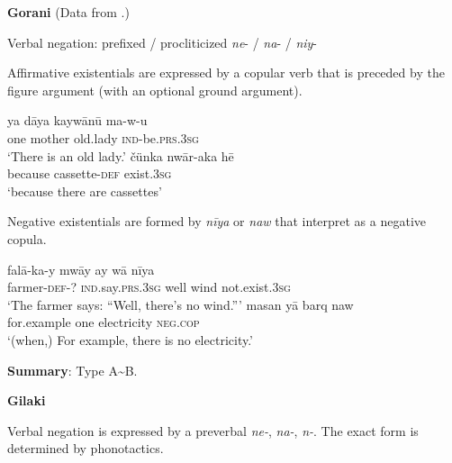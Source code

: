﻿\documentclass[output=paper]{langsci/langscibook}
\begin{document}
\begin{unindented}
\textbf{Gorani} (Data from \citealt{MahmoudveysiBailey2012}.)

Verbal negation: prefixed / procliticized \textit{ne}- / \textit{na}- /
\textit{niy}- \parencite[25]{MahmoudveysiBailey2012}

Affirmative existentials are expressed by a copular verb that is preceded by the figure argument (with an optional ground argument).
%
\begin{exe}\ex \gll ya   dāya    kaywānū ma-w-u \\
one mother old.lady  \textsc{ind}-be.\textsc{prs.3sg} \\
    \glt `There is an old lady.' \parencite[15]{MahmoudveysiBailey2012}
\ex \gll čünka    nwār-aka       hē \\
because cassette-\textsc{def}  exist.\textsc{3sg} \\
    \glt `because there are cassettes' \parencite[34]{MahmoudveysiBailey2012}
    \end{exe}

Negative existentials are formed by \textit{nīya} or \textit{naw} that
\citeauthor{MahmoudveysiBailey2012} interpret as a negative copula. 
%
\begin{exe}\ex
    \gll falā-ka-y mwāy ay     wā     nīya \\
farmer-\textsc{def}-?   \textsc{ind}.say.\textsc{prs}.\textsc{3sg}  well  wind  not.exist.\textsc{3sg} \\
    \glt `The farmer says: “Well, there's no wind.”'
\parencite[61]{MahmoudveysiBailey2012}
\ex \gll masan yā   barq         naw \\
for.example one electricity \textsc{neg.cop} \\
    \glt `(when,) For example, there is no electricity.'
\parencite[159]{MahmoudveysiBailey2012}
    \end{exe}

\textbf{Summary}: Type A{\textasciitilde}B.

\textbf{Gilaki} \parencite{RastorguevaKerimova2012}

Verbal negation is expressed by a preverbal \textit{ne-}, \textit{na-}, \textit{n-}. The exact form is determined by phonotactics. 


\end{unindented}
\end{document}
